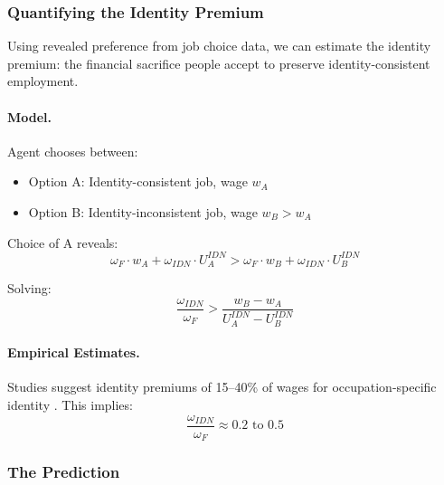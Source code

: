 \subsubsection{Quantifying the Identity Premium}

Using revealed preference from job choice data, we can estimate the 
identity premium: the financial sacrifice people accept to preserve 
identity-consistent employment.

\paragraph{Model.}
Agent chooses between:
\begin{itemize}
  \item Option A: Identity-consistent job, wage $w_A$
  \item Option B: Identity-inconsistent job, wage $w_B > w_A$
\end{itemize}

Choice of A reveals:
\begin{equation}
\omega_F \cdot w_A + \omega_{IDN} \cdot U^{IDN}_A > \omega_F \cdot w_B + \omega_{IDN} \cdot U^{IDN}_B
\end{equation}

Solving:
\begin{equation}
\frac{\omega_{IDN}}{\omega_F} > \frac{w_B - w_A}{U^{IDN}_A - U^{IDN}_B}
\end{equation}

\paragraph{Empirical Estimates.}
Studies suggest identity premiums of 15--40\% of wages for occupation-specific 
identity \citep{akerlof2000identity}. This implies:
\begin{equation}
\frac{\omega_{IDN}}{\omega_F} \approx 0.2 \text{ to } 0.5
\end{equation}

\subsubsection{The Prediction}

